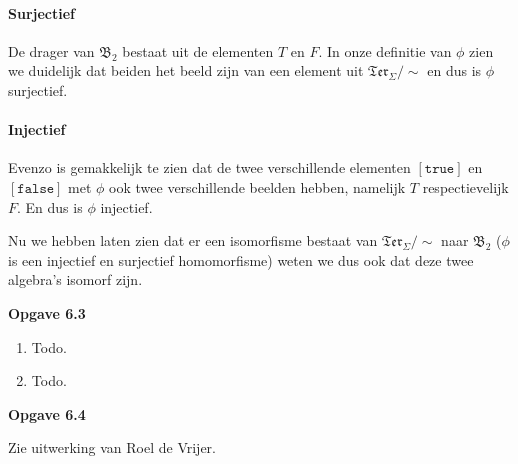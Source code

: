 \documentclass[a4paper,11pt]{article}
\begin{document}
\begin{enumerate}
\paragraph{Surjectief}

De drager van $\mathfrak{B}_{2}$ bestaat uit de elementen $T$ en $F$. In onze
definitie van $\phi$ zien we duidelijk dat beiden het beeld zijn van een
element uit $\mathfrak{Ter}_{\Sigma}/\sim$ en dus is $\phi$ surjectief.

\paragraph{Injectief}

Evenzo is gemakkelijk te zien dat de twee verschillende elementen
$[\texttt{true}]$ en $[\texttt{false}]$ met $\phi$ ook twee verschillende
beelden hebben, namelijk $T$ respectievelijk $F$. En dus is $\phi$ injectief.

Nu we hebben laten zien dat er een isomorfisme bestaat van
$\mathfrak{Ter}_{\Sigma}/\sim$ naar $\mathfrak{B}_{2}$ ($\phi$ is een
injectief en surjectief homomorfisme) weten we dus ook dat deze twee algebra's
isomorf zijn.\\[2em]

\end{enumerate}


{\bf Opgave 6.3}

\begin{enumerate}

\item %

Todo.

\item %

Todo.\\[2em]

\end{enumerate}


{\bf Opgave 6.4}

Zie uitwerking van Roel de Vrijer.\\[2em]
\end{document}
